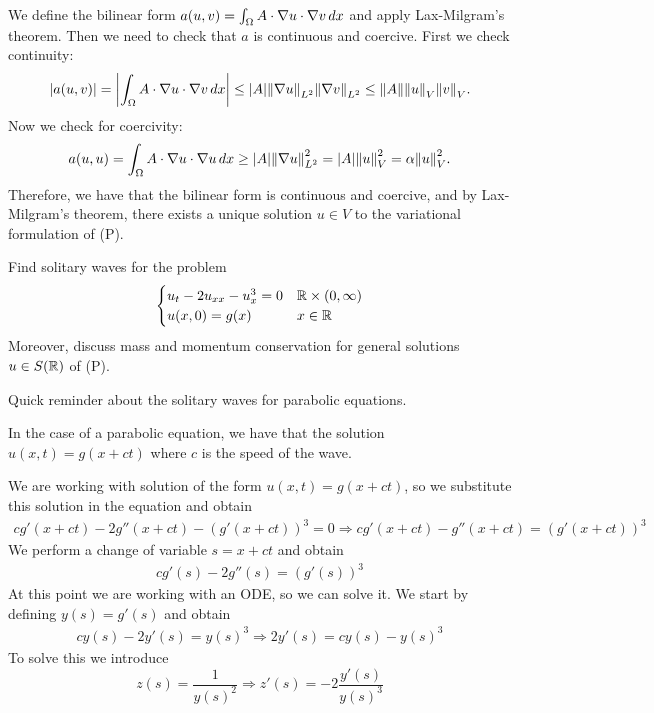 We define the bilinear form \(a(u,v) = \int_{\Omega} A \cdot \nabla u \cdot \nabla v \, dx\) and apply Lax-Milgram's theorem. Then we need to check that \(a\) is continuous and coercive. First we check continuity:
\[
\abs{a(u,v)} = \abs{\int_{\Omega} A \cdot \nabla u \cdot \nabla v \, dx} \leq \abs{A} \norm{\nabla u}_{L^2} \norm{\nabla v}_{L^2} \leq \norm{A} \norm{u}_{V} \norm{v}_{V}.
\]
Now we check for coercivity:
\[
a(u,u) = \int_{\Omega} A \cdot \nabla u \cdot \nabla u \, dx \geq \abs{A} \norm{\nabla u}_{L^2}^2 = \abs{A}  \norm{u}_{V}^2 = \alpha \norm{u}_{V}^2.
\]
Therefore, we have that the bilinear form is continuous and coercive, and by Lax-Milgram's theorem, there exists a unique solution \(u \in V\) to the variational formulation of (P).

\newpage
\begin{exercise}
    Find solitary waves for the problem
    \[
        \begin{cases}
            u_t - 2u_{xx} - u_x^3 = 0 & \mathbb{R} \times (0, \infty) \\
            u(x, 0) = g(x) & x \in \mathbb{R}
        \end{cases}
    \]
    Moreover, discuss mass and momentum conservation for general solutions \(u \in S(\mathbb{R})\) of (P).
\end{exercise}
Quick reminder about the solitary waves for parabolic equations. 
\begin{remark}
    In the case of a parabolic equation, we have that the solution \(u(x,t) =  g(x + ct)\) where \(c\) is the speed of the wave.
\end{remark}
We are working with solution of the form \(u(x,t) = g(x + ct)\), so we substitute this solution in the equation and obtain
\[
    \begin{split}
        cg'(x+ct) - 2g''(x+ct) - (g'(x+ct))^3 = 0 \Rightarrow cg'(x+ct) - g''(x+ct) = (g'(x+ct))^3
    \end{split}
\]
We perform a change of variable \(s = x + ct\) and obtain
\[
    \begin{split}
        cg'(s) - 2g''(s) = (g'(s))^3
    \end{split}
\]
At this point we are working with an ODE, so we can solve it. We start by defining \(y(s) = g'(s)\) and obtain
\[
    \begin{split}
        cy(s) - 2y'(s) = y(s)^3 \Rightarrow 2y'(s) = cy(s) - y(s)^3 
    \end{split}
\]
To solve this we introduce 
\[
    z(s) = \frac{1}{y(s)^2} \Rightarrow z'(s) = -2 \frac{y'(s)}{y(s)^3} 
\]

